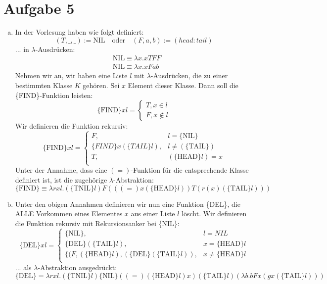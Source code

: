 \documentclass[11, 12pt]{article}
\begin{document}
\section*{Aufgabe 5}
\begin{enumerate}[(a)]
\item In der Vorlesung haben wie folgt definiert:
\begin{equation*}
	(T,\_,\_):=\text{NIL}\quad \text{oder}\quad (F,a,b):=(head:tail)
\end{equation*}
... in $\lambda$-Ausdrücken:
\begin{align*}
	&\text{NIL}\equiv \lambda x.xTFF\\
	&\text{NIL}\equiv \lambda x.xFab
\end{align*}
Nehmen wir an, wir haben eine Liste $l$ mit $\lambda$-Ausdrücken, die zu einer bestimmten Klasse $K$ gehören. Sei $x$ Element dieser Klasse. Dann soll die \{FIND\}-Funktion leisten:
\begin{equation*}
	\{\text{FIND}\} x l = \begin{cases}
	T, x\in l\\
	F, x\not\in l
	\end{cases}
\end{equation*}
Wir definieren die Funktion rekursiv:
\begin{equation*}
	\{\text{FIND}\} x l = \begin{cases}
	F,&l=\{\text{NIL}\}\\
	\{FIND\} x (\{TAIL\}l),&l\neq(\{\text{TAIL}\})\\
	T,&(\{\text{HEAD}\}l)=x\\
	\end{cases}
\end{equation*}
Unter der Annahme, dass eine $(=)$-Funktion für die entsprechende Klasse definiert ist, ist die zugehörige $\lambda$-Abstraktion:
\begin{equation*}
	\{\text{FIND}\}\equiv \lambda rxl.(\{\text{TNIL}\}l)F(((=)x(\{\text{HEAD}\}l))T(r(x)(\{\text{TAIL}\}l)))
\end{equation*}
\item Unter den obigen Annahmen definieren wir nun eine Funktion \{DEL\}, die ALLE Vorkommen eines Elementes $x$ aus einer Liste $l$ löscht. Wir definieren die Funktion rekursiv mit Rekursionsanker bei \{NIL\}:
\begin{equation*}
	\{\text{DEL}\} x l = \begin{cases}
	\{\text{NIL}\},& l={NIL}\\
	\{\text{DEL}\}(\{\text{TAIL}\}l),& x=\{\text{HEAD}\}l\\
	\{(F,(\{\text{HEAD}\}l),(\{\text{DEL}\}(\{\text{TAIL}\}l)),& x\not=\{\text{HEAD}\}l\\
	\end{cases}
\end{equation*}
... als $\lambda$-Abstraktion ausgedrückt:
\begin{equation*}
\{\text{DEL}\} = \lambda rxl.  (\{\text{TNIL}\}l) \{\text{NIL}\} ((=)(\{\text{HEAD}\}l)x)(\{\text{TAIL}\}l)(\lambda b.bFx(gx(\{\text{TAIL}\}l)))
\end{equation*}


\end{enumerate}
\end{document}
